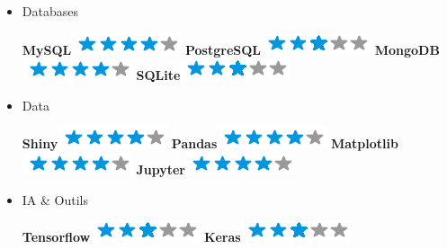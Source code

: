 \documentclass[]{friggeri-cv}
\begin{document}
\begin{flushright}
\begin{multicols}{3}
\begin{itemize}
\columnbreak
\item Databases \
\begin{flushright}

\textbf{MySQL}\includegraphics[scale=0.40]{res/img/4stars.png}
\textbf{PostgreSQL}\includegraphics[scale=0.40]{res/img/3stars.png}
\textbf{MongoDB}\includegraphics[scale=0.40]{res/img/4stars.png}
\textbf{SQLite}\includegraphics[scale=0.40]{res/img/3stars.png}
\end{flushright}            

\item Data \
\begin{flushright}

\textbf{Shiny}\includegraphics[scale=0.40]{res/img/4stars.png}
\textbf{Pandas}\includegraphics[scale=0.40]{res/img/4stars.png}
\textbf{Matplotlib}\includegraphics[scale=0.40]{res/img/4stars.png}
\textbf{Jupyter}\includegraphics[scale=0.40]{res/img/4stars.png}
\end{flushright}            

\item IA \& Outils \
\begin{flushright}

\textbf{Tensorflow}\includegraphics[scale=0.40]{res/img/3stars.png}
\textbf{Keras}\includegraphics[scale=0.40]{res/img/3stars.png}
\end{flushright}            


\end{itemize}
\end{multicols}
\end{flushright}
\end{document}

